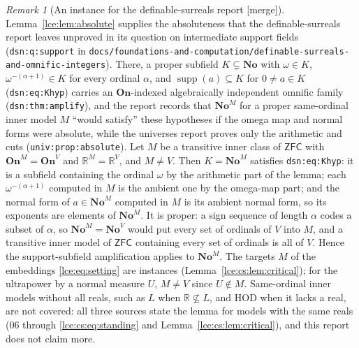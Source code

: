 \documentclass[11pt,letterpaper]{article}
\numberwithin{equation}{section}
\theoremstyle{definition}
\theoremstyle{remark}
\newtheorem{remark}[theorem]{Remark}
\newcommand{\No}{\mathbf{No}}
\newcommand{\On}{\mathbf{On}}
\newcommand{\R}{\mathbb R}
\newcommand{\supp}{\operatorname{supp}}
\newcommand{\ZFC}{\mathsf{ZFC}}
\newcommand{\leref}[1]{Lemma~\ref{#1}}
\newcommand{\mergetag}{\textup{\textsf{\small[merge]}}}%
\newcommand{\lbl}[1]{\nolinkurl{#1}}%
\newcommand{\fn}[1]{\nolinkurl{#1}}%
\begin{document}
\begin{remark}[An instance for the definable-surreals report \mergetag]
\label{lce:rem:dsnsupport}
\leref{lce:lem:absolute} supplies the absoluteness that the
definable-surreals report leaves unproved in its question on intermediate
support fields (\lbl{dsn:q:support} in
\fn{docs/foundations-and-computation/definable-surreals-and-omnific-integers}).
There, a proper subfield $K\subsetneq\No$ with $\omega\in K$,
$\omega^{-(\alpha+1)}\in K$ for every ordinal $\alpha$, and
$\supp(a)\subseteq K$ for $0\ne a\in K$ (\lbl{dsn:eq:Khyp}) carries an
$\On$-indexed algebraically independent omnific family
(\lbl{dsn:thm:amplify}), and the report records that $\No^M$ for a proper
same-ordinal inner model $M$ ``would satisfy'' these hypotheses if the omega
map and normal forms were absolute, while the universes report proves only
the arithmetic and cuts (\lbl{univ:prop:absolute}). Let $M$ be a transitive
inner class of $\ZFC$ with $\On^M=\On^V$ and $\R^M=\R^V$, and $M\ne V$. Then
$K=\No^M$ satisfies \lbl{dsn:eq:Khyp}: it is a subfield containing the
ordinal $\omega$ by the arithmetic part of the lemma; each
$\omega^{-(\alpha+1)}$ computed in $M$ is the ambient one by the omega-map
part; and the normal form of $a\in\No^M$ computed in $M$ is its ambient
normal form, so its exponents are elements of $\No^M$. It is proper: a sign
sequence of length $\alpha$ codes a subset of $\alpha$, so $\No^M=\No^V$
would put every set of ordinals of $V$ into $M$, and a transitive inner
model of $\ZFC$ containing every set of ordinals is all of $V$. Hence the
support-subfield amplification applies to $\No^M$. The targets $M$ of the
embeddings \eqref{lce:eq:setting} are instances (\leref{lce:cs:lem:critical});
for the ultrapower by a normal measure $U$, $M\ne V$ since $U\notin M$.
Same-ordinal inner models without all reals, such as $L$ when
$\R\not\subseteq L$, and $\mathrm{HOD}$ when it lacks a real, are not
covered: all three sources state the lemma for models with the same reals
(06 through \eqref{lce:cs:eq:standing} and \leref{lce:cs:lem:critical}), and
this report does not claim more.
\end{remark}
\end{document}
